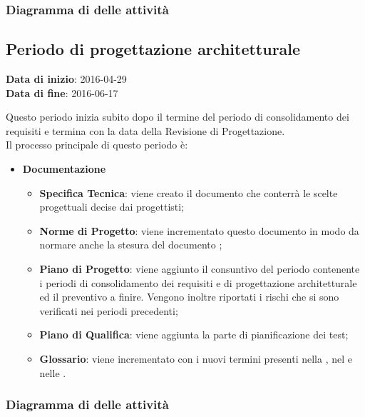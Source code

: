 		
		\subsubsection{Diagramma di  delle attività}
		
	\subsection{Periodo di progettazione architetturale}
	\begin{center}
		\textbf{Data di inizio}: 2016-04-29 \\
		\textbf{Data di fine}: 2016-06-17 \\
	\end{center}
	Questo periodo inizia subito dopo il termine del periodo di consolidamento dei requisiti e termina con la data della Revisione di Progettazione. \\
	Il processo principale di questo periodo è:
		\begin{itemize}
			\item \textbf{Documentazione}
			\att
			\begin{itemize}
				\item \textbf{Specifica Tecnica}: viene creato il documento \STdocRP{} che conterrà le scelte progettuali decise dai progettisti; 
				\item \textbf{Norme di Progetto}: viene incrementato questo documento in modo da normare anche la stesura del documento \STdocRP;
				\item \textbf{Piano di Progetto}: viene aggiunto il consuntivo del periodo contenente i periodi di consolidamento dei requisiti e di progettazione architetturale ed il preventivo a finire. Vengono inoltre riportati i rischi che si sono verificati nei periodi precedenti;
				\item \textbf{Piano di Qualifica}: viene aggiunta la parte di pianificazione dei test;
				\item \textbf{Glossario}: viene incrementato con i nuovi termini presenti nella \STdocRP, nel \PQdocRP{} e nelle \NPdocRP.
			\end{itemize}
		\end{itemize}
		\subsubsection{Diagramma di  delle attività}
		
